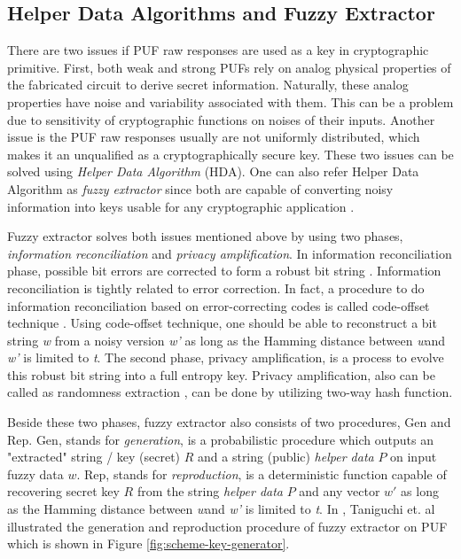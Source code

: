 \subsection{Helper Data Algorithms and Fuzzy Extractor}

There are two issues if PUF raw responses are used as a key in cryptographic primitive. First, both weak and strong PUFs rely on analog physical properties of the fabricated circuit to derive secret information. Naturally, these analog properties have noise and variability associated with them.
This can be a problem due to sensitivity of cryptographic functions on noises of their inputs.
Another issue is the PUF raw responses usually are not uniformly distributed, which makes it an unqualified as a cryptographically secure key. These two issues can be solved using \textit{Helper Data Algorithm} (HDA). One can also refer Helper Data Algorithm as \textit{fuzzy extractor} since both are capable of converting noisy information into keys usable for any cryptographic application \cite{efficient_helper} \cite{fuzzy_extractor}.

Fuzzy extractor solves both issues mentioned above by using two phases, \textit{information reconciliation} and \textit{privacy amplification}. In information reconciliation phase, possible bit errors are corrected to form a robust bit string \cite{soft_decision}. Information reconciliation is tightly related to error correction. In fact, a procedure to do information reconciliation based on error-correcting codes is called code-offset technique \cite{fuzzy_extractor}. Using code-offset technique, one should be able to reconstruct a bit string \textit{w} from a noisy version \textit{w'} as long as the Hamming distance between \textit{w}and \textit{w'} is limited to \textit{t}.
The second phase, privacy amplification, is a process to evolve this robust bit string into a full entropy key. Privacy amplification, also can be called as randomness extraction \cite{information_reconciliation}, can be done by utilizing two-way hash function.

Beside these two phases, fuzzy extractor also consists of two procedures, \large{Gen} and \large{Rep}. \large{Gen}, stands for \textit{generation}, is a probabilistic procedure which outputs an "extracted" string / key (secret) $R$ and a string (public) \textit{helper data} $P$ on input fuzzy data $w$. \large{Rep}, stands for \textit{reproduction}, is a deterministic function capable of recovering secret key $R$ from the string \textit{helper data} $P$ and any vector $w'$ as long as the Hamming distance between \textit{w}and \textit{w'} is limited to \textit{t}.
In \cite{stable_key_generation}, Taniguchi et. al illustrated the generation and reproduction procedure of fuzzy extractor on PUF which is shown in Figure \ref{fig:scheme-key-generator}.


